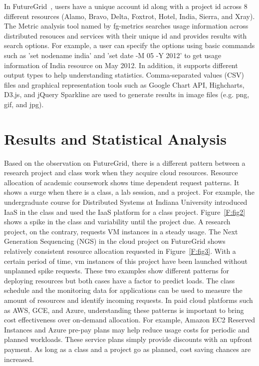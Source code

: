 \documentclass{sig-alternate-05-2015}
\begin{document}
In FutureGrid~\cite{las2010gce,las12fg-bookchapter}, users have a unique account id along with a project id across 8 different resources (Alamo, Bravo, Delta, Foxtrot, Hotel, India, Sierra, and Xray). The Metric analysis tool named by fg-metrics searches usage information across distributed resouces and services with their unique id and provides results with search options. For example, a user can specify the options using basic commands such as 'set nodename india' and 'set date -M 05 -Y 2012' to get usage information of India resource on May 2012. In addition, it supports different output types to help understanding statistics. Comma-separated values (CSV) files and graphical representation tools such as Google Chart API, Highcharts, D3.js, and jQuery Sparkline are used to generate results in image files (e.g. png, gif, and jpg).

\section{Results and Statistical Analysis} \label{S:result}

Based on the observation on FutureGrid, there is a different pattern between a research project and class work when they acquire cloud resources. Resource allocation of academic coursework shows time dependent request patterns. It shows a surge when there is a class, a lab session, and a project. For example, the undergraduate course for Distributed Systems at Indiana University introduced IaaS in the class and used the IaaS platform for a class project. Figure~\ref{F:fig2} shows a spike in the class and variability until the project due. A research project, on the contrary, requests VM instances in a steady usage. The Next Generation Sequencing (NGS) in the cloud project on FutureGrid shows relatively consistent resource allocation requested in Figure~\ref{F:fig3}. With a certain period of time, vm instances of this project have been launched without unplanned spike requests. These two examples show different patterns for deploying resources but both cases have a factor to predict loads. The class schedule and the monitoring data for applications can be used to measure the amount of resources and identify incoming requests. In paid cloud platforms such as AWS, GCE, and Azure, understanding these patterns is important to bring cost effectiveness over on-demand allocation. For example, Amazon EC2 Reserved Instances and Azure pre-pay plans may help reduce usage costs for periodic and planned workloads. These service plans simply provide discounts with an upfront payment. As long as a class and a project go as planned, cost saving chances are increased.
\end{document}
